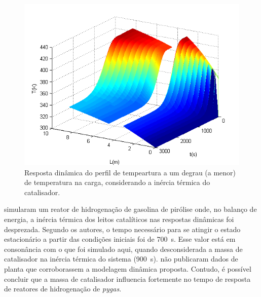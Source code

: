 \begin{figure}[htb]
\centering
\includegraphics[scale=0.8]{images/Chap4/Feed_T_300K_catalyst_influence.png}
\caption{Resposta dinâmica do perfil de tempeartura a um degrau (a menor) de
temperatura na carga, considerando a inércia térmica do catalisador.}
\label{fig:Feed_T_300K_catalyst_influence}
\end{figure}

 simularam um reator de hidrogenação de
gasolina de pirólise onde, no balanço de energia, a inércia térmica dos leitos
catalíticos nas respostas dinâmicas foi desprezada. Segundo os autores, o tempo
necessário para se atingir o estado estacionário a partir das condições
iniciais foi de \SI{700}{s}. Esse valor está em consonância com o que foi
simulado aqui, quando desconsiderada a massa de catalisador na inércia térmica
do sistema (\SI{900}{s}).  não publicaram dados
de planta que corroborassem a modelagem dinâmica proposta. Contudo, é possível
concluir que a massa de catalisador influencia fortemente no tempo de resposta
de reatores de hidrogenação de \emph{pygas}.

% 

